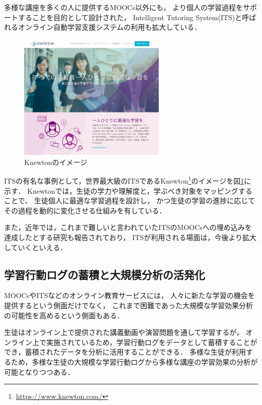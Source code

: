 多様な講座を多くの人に提供するMOOCs以外にも，
より個人の学習過程をサポートすることを目的として設計された，
Intelligent Tutoring System(ITS)と呼ばれるオンライン自動学習支援システムの利用も拡大している\cite{sleeman1982intelligent}．

\begin{figure}[htb]
\begin{center}
\includegraphics[width=200pt]{./img/knewton.pdf}
\end{center}
\caption{Knewtonのイメージ}
\label{fig:knewton}
\end{figure}

ITSの有名な事例として，世界最大級のITSであるKnewton\footnote{\url{https://www.knewton.com/}}のイメージを図\ref{fig:knewton}に示す．
Knewtonでは，生徒の学力や理解度と，学ぶべき対象をマッピングすることで、
生徒個人に最適な学習過程を設計し，
かつ生徒の学習の進捗に応じてその過程を動的に変化させる仕組みを有している\cite{upbin2012knewton}．


また，近年では，これまで難しいと言われていたITSのMOOCsへの埋め込みを達成したとする研究\cite{aleven2015beginning}も報告されており，
ITSが利用される場面は，今後より拡大していくといえる．



\subsection{学習行動ログの蓄積と大規模分析の活発化}

MOOCsやITSなどのオンライン教育サービスには，
人々に新たな学習の機会を提供するという側面だけでなく，
これまで困難であった大規模な学習効果分析の可能性を高めるという側面もある．

生徒はオンライン上で提供された講義動画や演習問題を通して学習するが，
オンライン上で実施されているため，学習行動ログをデータとして蓄積することができ，蓄積されたデータを分析に活用することができる．
多様な生徒が利用するため，多様な生徒の大規模な学習行動ログから多様な講座の学習効果の分析が可能となりつつある．

